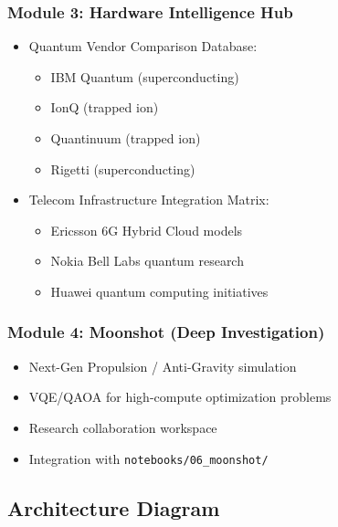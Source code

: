 \documentclass[11pt,a4paper]{article}
\begin{document}
\subsubsection{Module 3: Hardware Intelligence Hub}
\begin{itemize}
    \item Quantum Vendor Comparison Database:
    \begin{itemize}
        \item IBM Quantum (superconducting)
        \item IonQ (trapped ion)
        \item Quantinuum (trapped ion)
        \item Rigetti (superconducting)
    \end{itemize}
    \item Telecom Infrastructure Integration Matrix:
    \begin{itemize}
        \item Ericsson 6G Hybrid Cloud models
        \item Nokia Bell Labs quantum research
        \item Huawei quantum computing initiatives
    \end{itemize}
\end{itemize}

\subsubsection{Module 4: Moonshot (Deep Investigation)}
\begin{itemize}
    \item Next-Gen Propulsion / Anti-Gravity simulation
    \item VQE/QAOA for high-compute optimization problems
    \item Research collaboration workspace
    \item Integration with \texttt{notebooks/06\_moonshot/}
\end{itemize}

\subsection{Architecture Diagram}
\end{document}
